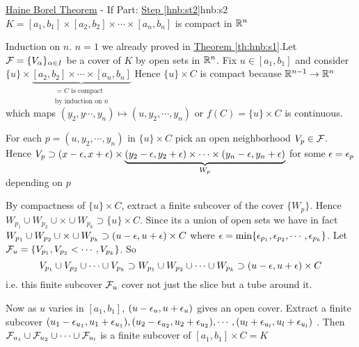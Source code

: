 \begin{Theorem}{\hyperref[th:hnb]{Haine Borel Theorem} - If Part: \hyperref[hnb:st2]{Step \ref{hnb:st2}}}{hnb:s2}
	$K=[a_1,b_1]\times[a_2,b_2]\times \cdots\times [a_n,b_n]$ is compact in $\mathbb{R}^n$
\end{Theorem}
\begin{myproof}
	Induction on $n$. $n=1$ we already proved in \hyperref[th:hnb:s1]{Theorem \ref{th:hnb:s1}}.Let $\mathcal{F}=\{V_{\alpha}\}_{\alpha\in I}$ be a cover of $K$ by open sets in $\mathbb{R}^n$. Fix $u\in [a_1,b_1]$ and consider  $\{u\}\times \underbrace{[a_2,b_2]\times \cdots\times [a_n,b_n]}_{\substack{=C\text{ is compact}\\\text{by induction on }n}}$ Hence $\{u\}\times C$ is compact because   $\mathbb{R}^{n-1}\to\mathbb{R}^n$ which maps $(y_2,y\cdots,y_n)\mapsto (u,y_2,\cdots,y_n)$ or $ {f(C)=\{u\}\times C} $ is continuous.

	For each $p=(u,y_2,\cdots,y_n)$ in $\{u\}\times C$ pick an open neighborhood $V_p\in \mathcal{F}$. Hence $V_{p}\supset (x-\epsilon,x+\epsilon)\times \underbrace{(y_2-\epsilon,y_2+\epsilon)\times \cdots\times (y_n-\epsilon,y_n+\epsilon)}_{W_p}$ for some $\epsilon=\epsilon_p$ depending on $p$
	\begin{center}
	\end{center}
	By compactness of $\{u\}\times C$, extract a finite subcover of the cover $\{W_p\}$. Hence $W_{p_1}\cup W_{p_2}\cup\times \cup W_{p_k}\supset \{u\}\times C$. Since its a union of open sets we have in fact $W_{p_1}\cup W_{p_2}\cup\times \cup W_{p_k}\supset (u-\epsilon,u+\epsilon)\times C$ where $\epsilon=\min\{\epsilon_{p_1},\epsilon_{p_2},\cdots,\epsilon_{p_k}\}$. Let $\mathcal{F}_u=\{V_{p_1},V_{p_2}<\cdots,V_{p_k}\}$. So $$V_{p_1}\cup V_{p_2}\cup \cdots\cup V_{p_k}\supset W_{p_1}\cup W_{p_2}\cup\cdots\cup W_{p_k}\supset (u-\epsilon,u+\epsilon)\times C$$i.e. this finite subcover $\mathcal{F}_u$ cover not just the slice but a tube around it.

	Now as $u$ varies in $[a_1,b_1]$, $(u-\epsilon_u,u+\epsilon_u)$ gives an open cover. Extract a finite subcover  $(u_1-\epsilon_{u_1},u_1+\epsilon_{u_1}),(u_2-\epsilon_{u_2},u_2+\epsilon_{u_2}),\cdots,(u_l+\epsilon_{u_l},u_l+\epsilon_{u_l})$ . Then $\mathcal{F}_{u_1}\cup\mathcal{F}_{u_2}\cup\cdots\cup\mathcal{F}_{u_l}$ is a finite subcover of $[a_1,b_1]\times C=K$
\end{myproof}

